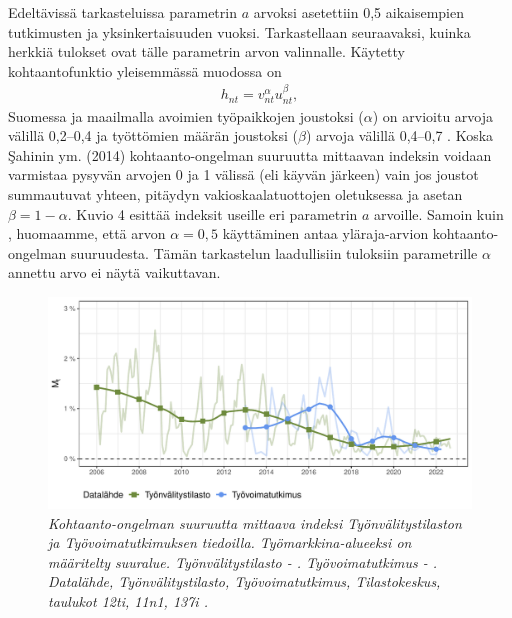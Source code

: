 \documentclass[12pt]{article}
\newcommand{\lastdatamonth}{\unskip}
\newcommand{\firstdatamonth}{\unskip}
\newcommand{\lastdataquarter}{\unskip}
\newcommand{\firstdataquarter}{\unskip}
\newcommand{\newcaption}[1]{\caption{\textit{\footnotesize{#1}}}}
\begin{document}
Edeltävissä tarkasteluissa parametrin $a$ arvoksi asetettiin 0,5 aikaisempien tutkimusten ja yksinkertaisuuden vuoksi. Tarkastellaan seuraavaksi, kuinka herkkiä tulokset ovat tälle parametrin arvon valinnalle. Käytetty kohtaantofunktio yleisemmässä muodossa on 
\begin{align}
h_{nt}=v_{nt}^\alpha u_{nt}^\beta,
\end{align}
Suomessa ja maailmalla avoimien työpaikkojen joustoksi ($\alpha$) on arvioitu arvoja välillä 0,2–0,4 ja työttömien määrän joustoksi ($\beta$) arvoja välillä 0,4–0,7 \cite{lahtonen2006matching, petrongolo2001looking}. Koska Şahinin ym. (2014) kohtaanto-ongelman suuruutta mittaavan indeksin voidaan varmistaa pysyvän arvojen 0 ja 1 välissä (eli käyvän järkeen) vain jos joustot summautuvat yhteen, pitäydyn vakioskaalatuottojen oletuksessa ja asetan $\beta = 1-\alpha$. Kuvio 4 esittää indeksit useille eri parametrin $a$ arvoille. Samoin kuin , huomaamme, että arvon $\alpha = 0,5$ käyttäminen antaa yläraja-arvion kohtaanto-ongelman suuruudesta. Tämän tarkastelun laadullisiin tuloksiin parametrille $\alpha$ annettu arvo ei näytä vaikuttavan. 

\begin{figure}
\centering
\includegraphics[scale = 0.8]{../kuviot/indeksi_suuralueittain.pdf}
    \newcaption{Kohtaanto-ongelman suuruutta mittaava indeksi Työnvälitystilaston ja Työvoimatutkimuksen tiedoilla. Työmarkkina-alueeksi on määritelty suuralue.  Työnvälitystilasto \protect \firstdatamonth \phantom{}  - \protect\lastdatamonth. Työvoimatutkimus \protect \firstdataquarter \phantom{} - \protect\lastdataquarter. Datalähde, Työnvälitystilasto, Työvoimatutkimus, Tilastokeskus, taulukot 12ti, 11n1, 137i  \protect \cite{svt2011}.}
   \label{fig:ld0923g}
\end{figure}
\end{document}
